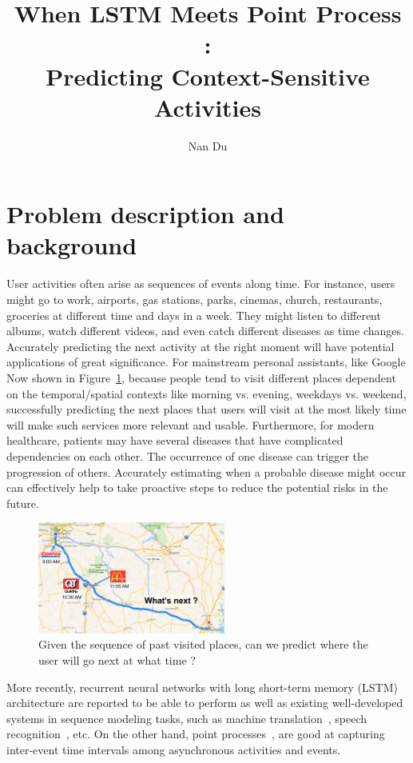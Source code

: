 \documentclass[11pt]{article}
\title{When LSTM Meets Point Process : \\ Predicting Context-Sensitive Activities}
\author{Nan Du
}
\date{}
\begin{document}
\maketitle

%	

\section{Problem description and background}

User activities often arise as sequences of events along time. For instance, users might go to work, airports, gas stations, parks, cinemas, church, restaurants, groceries at different time and days in a week. They might listen to different albums, watch different videos, and even catch different diseases as time changes. Accurately predicting the next activity at the right moment will have potential applications of great significance. For mainstream personal assistants, like Google Now shown in Figure~\ref{demo}, because people tend to visit different places dependent on the temporal/spatial contexts like morning vs. evening, weekdays vs. weekend, successfully predicting the next places that users will visit at the most likely time will make such services more relevant and usable. Furthermore, for modern healthcare, patients may have several diseases that have complicated dependencies on each other. The occurrence of one disease can trigger the progression of others. Accurately estimating when a probable disease might occur can effectively help to take proactive steps to reduce the potential risks in the future. 

\begin{figure}[h!]
\centering
\includegraphics[width=0.55\textwidth]{fig1}
\caption{\label{demo}Given the sequence of past visited places, can we predict where the user will go next at what time ?}
\end{figure}

More recently, recurrent neural networks with long short-term memory (LSTM) architecture are reported to be able to perform as well as existing well-developed systems in sequence modeling tasks, such as machine translation~\cite{SutVinLe2014}, speech recognition~\cite{SakSenBea2014}, etc. On the other hand, point processes~\cite{CoxIsh1980}, are good at capturing inter-event time intervals among asynchronous activities and events. 
\end{document}
